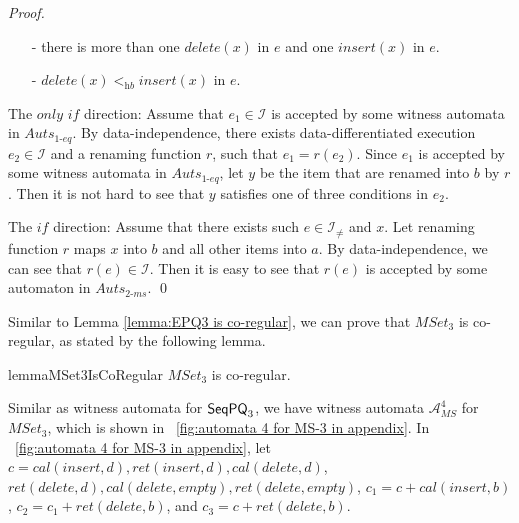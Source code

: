 {\begin {proof}
\begin{itemize}
\item[-] there is more than one $\textit{delete}(x)$ in $e$ and one $\textit{insert}(x)$ in $e$.

\item[-] $\textit{delete}(x) <_{\textit{hb}} \textit{insert}(x)$ in $e$.
\end{itemize}

\noindent The $\textit{only if}$ direction: Assume that $e_1 \in \mathcal{I}$ is accepted by some witness automata in $\textit{Auts}_{\textit{1-eq}}$. By data-independence, there exists data-differentiated execution $e_2 \in \mathcal{I}$ and a renaming function $r$, such that $e_1=r(e_2)$. Since $e_1$ is accepted by some witness automata in  $\textit{Auts}_{\textit{1-eq}}$, let $y$ be the item that are renamed into $b$ by $r$. Then it is not hard to see that $y$ satisfies one of three conditions in $e_2$.

\noindent The $\textit{if}$ direction: Assume that there exists such $e \in \mathcal{I}_{\neq}$ and $x$. Let renaming function $r$ maps $x$ into $b$ and all other items into $a$. By data-independence, we can see that $r(e) \in \mathcal{I}$. Then it is easy to see that $r(e)$ is accepted by some automaton in $\textit{Auts}_{\textit{2-ms}}$. \qed
\end {proof}

Similar to Lemma \ref{lemma:EPQ3 is co-regular}, we can prove that $\textit{MSet}_3$ is co-regular, as stated by the following lemma.

\begin{restatable}{lemma}{MSet3IsCoRegular}
\label{lemma:MSet3 is co-regular}
$\textit{MSet}_3$ is co-regular.
\end{restatable}

Similar as witness automata for $\mathsf{SeqPQ}_3$, we have witness automata $\mathcal{A}_{\textit{MS}}^4$ for $\textit{MSet}_3$, which is shown in \figurename~\ref{fig:automata 4 for MS-3 in appendix}. In \figurename~\ref{fig:automata 4 for MS-3 in appendix}, let $c = \textit{cal}(\textit{insert},d),\textit{ret}(\textit{insert},d), \textit{cal}(\textit{delete},d)$, $\textit{ret}(\textit{delete},d),\textit{cal}(\textit{delete},\textit{empty}),\textit{ret}(\textit{delete},\textit{empty})$, $c_1 = c + \textit{cal}(\textit{insert},b)$, $c_2 = c_1 + \textit{ret}(\textit{delete},b)$, and $c_3 = c + \textit{ret}(\textit{delete},b)$.

}
